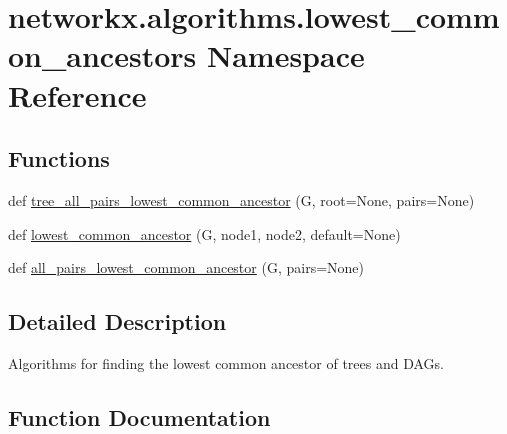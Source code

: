 \hypertarget{namespacenetworkx_1_1algorithms_1_1lowest__common__ancestors}{}\section{networkx.\+algorithms.\+lowest\+\_\+common\+\_\+ancestors Namespace Reference}
\label{namespacenetworkx_1_1algorithms_1_1lowest__common__ancestors}
\subsection*{Functions}
\begin{DoxyCompactItemize}
\item 
def \hyperlink{namespacenetworkx_1_1algorithms_1_1lowest__common__ancestors_ade5ca883bc479d9fbdb18f62e304d50c}{tree\+\_\+all\+\_\+pairs\+\_\+lowest\+\_\+common\+\_\+ancestor} (G, root=None, pairs=None)
\item 
def \hyperlink{namespacenetworkx_1_1algorithms_1_1lowest__common__ancestors_aac710fb1ce420562a02fa807a6b42520}{lowest\+\_\+common\+\_\+ancestor} (G, node1, node2, default=None)
\item 
def \hyperlink{namespacenetworkx_1_1algorithms_1_1lowest__common__ancestors_a1a1b8bc8006cf95dbab5479ea7240e5e}{all\+\_\+pairs\+\_\+lowest\+\_\+common\+\_\+ancestor} (G, pairs=None)
\end{DoxyCompactItemize}


\subsection{Detailed Description}
\begin{DoxyVerb}Algorithms for finding the lowest common ancestor of trees and DAGs.\end{DoxyVerb}
 

\subsection{Function Documentation}
\mbox{\label{namespacenetworkx_1_1algorithms_1_1lowest__common__ancestors_a1a1b8bc8006cf95dbab5479ea7240e5e}} 
